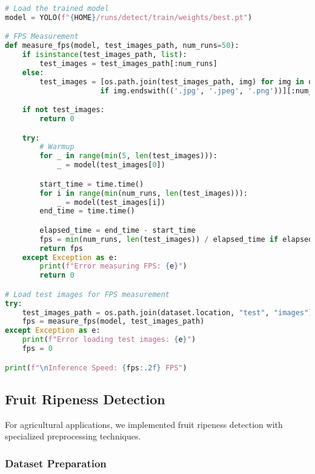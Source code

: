\begin{lstlisting}[language=Python, caption={Blood Cell Detection Evaluation and FPS Measurement}, label={lst:blood-eval}]
# Load the trained model
model = YOLO(f"{HOME}/runs/detect/train/weights/best.pt")

# FPS Measurement
def measure_fps(model, test_images_path, num_runs=50):
    if isinstance(test_images_path, list):
        test_images = test_images_path[:num_runs]
    else:
        test_images = [os.path.join(test_images_path, img) for img in os.listdir(test_images_path)
                      if img.endswith(('.jpg', '.jpeg', '.png'))][:num_runs]

    if not test_images:
        return 0

    try:
        # Warmup
        for _ in range(min(5, len(test_images))):
            _ = model(test_images[0])

        start_time = time.time()
        for i in range(min(num_runs, len(test_images))):
            _ = model(test_images[i])
        end_time = time.time()

        elapsed_time = end_time - start_time
        fps = min(num_runs, len(test_images)) / elapsed_time if elapsed_time > 0 else 0
        return fps
    except Exception as e:
        print(f"Error measuring FPS: {e}")
        return 0

# Load test images for FPS measurement
try:
    test_images_path = os.path.join(dataset.location, "test", "images")
    fps = measure_fps(model, test_images_path)
except Exception as e:
    print(f"Error loading test images: {e}")
    fps = 0

print(f"\nInference Speed: {fps:.2f} FPS")
\end{lstlisting}

\subsection{Fruit Ripeness Detection}
\label{appendix:fruit-code}

For agricultural applications, we implemented fruit ripeness detection with specialized preprocessing techniques.

\subsubsection{Dataset Preparation}

